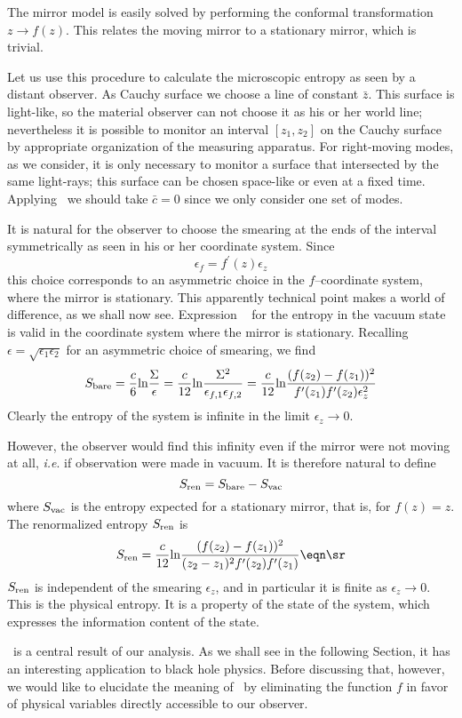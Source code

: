 The mirror model is  easily solved by performing the
conformal transformation $z\rightarrow f(z)$. This relates
the moving mirror to a stationary mirror, which is trivial.

Let us use this procedure to
calculate the microscopic entropy as seen by a
distant observer. As Cauchy surface we choose a line of
constant $\bar z$. This surface is light-like, so the material
observer can not choose it as his or her world line; nevertheless
it is
possible to monitor an interval $[z_1,z_2]$ on the Cauchy
surface by appropriate organization of the measuring apparatus.
For right-moving modes, as we consider, it is only necessary to
monitor a surface that intersected by the same light-rays; this surface
can be chosen space-like or even at a fixed time. Applying \se\ we should
take $\bar{c}=0$ since we only consider one set of modes.


It is natural for the observer to choose the smearing
at the ends of the interval symmetrically as seen in his or her
coordinate system. Since
$$
\epsilon_f=f^{\prime}(z)\epsilon_z
$$
this choice corresponds to an asymmetric choice in the $f$--coordinate
system, where the mirror is stationary. This apparently technical point
makes a world of difference, as we shall now see.
Expression \se~ for the entropy in the vacuum state is valid in the
coordinate system where the mirror is stationary. Recalling
$\epsilon=\sqrt{\epsilon_1\epsilon_2}$ for an asymmetric
choice of smearing, we find
$$
S_{\rm bare}={c\over 6}{\rm ln}{\Sigma\over\epsilon}={c\over 12}{\rm ln}
{\Sigma^2\over\epsilon_{f,1}\epsilon_{f,2}}={c\over 12}{\rm ln}
{(f(z_2)-f(z_1))^2\over f^{\prime}(z_1)f^{\prime}(z_2)\epsilon^2_z}
$$
Clearly the entropy of the system is infinite in the limit
$\epsilon_z\rightarrow 0$.

However, the observer would find this infinity
even if the mirror were not moving at all, {\it i.e}. if
observation were made in vacuum.
It is therefore natural to define
$$
S_{\rm ren}=S_{\rm bare}-S_{\rm vac}
$$
where $S_{\rm vac}$ is the entropy expected for a stationary mirror,
that is, for $f(z)=z$.
The renormalized entropy $S_{\rm ren}$ is
$$
S_{\rm ren}={c\over 12}{\rm ln}
{(f(z_2)-f(z_1))^2\over (z_2-z_1)^2 f^{\prime}(z_2)f^{\prime}(z_1)}
\eqn\sr
$$
$S_{\rm ren}$  is independent of the smearing $\epsilon_z$, and
in particular it is finite as $\epsilon_z\rightarrow 0$.
This is the physical entropy. It is a property of the state of
the system, which expresses the information content of the state.

\sr\ is a central result of our analysis.   As we shall see in the
following
Section, it has an interesting application to black hole physics.
Before discussing that, however, we would like to elucidate the
meaning of \sr\ by eliminating the function $f$ in favor of physical
variables directly accessible to our observer.


